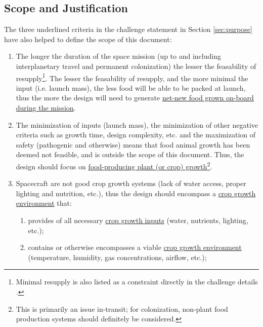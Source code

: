 \documentclass{report}
\begin{document}

\newpage

\subsection{Scope and Justification}
\label{sec:scope}

The three underlined criteria in the challenge statement in Section \ref{sec:purpose} have also helped to define the scope of this document:
\begin{enumerate}[label=SC\arabic*., ref=SC\arabic*]
\item \label{sc:1} The longer the duration of the space mission (up to and including interplanetary travel and permanent colonization) the lesser the feasability of
    resupply\footnote{Minimal resupply is also listed as a constraint directly in the challenge details \cite{applicantguide}.}.
    The lesser the feasability of resupply, and the more minimal the input (i.e. launch mass), the less food will be able to be packed at launch, thus the more the design will need to generate \uline{net-new food grown on-board during the mission}.
\item \label{sc:2} The minimization of inputs (launch mass), the minimization of other negative criteria such as growth time, design complexity, etc. and the maximization of safety (pathogenic and otherwise) means that food animal growth has been deemed not feasible, and is outside the scope of this document. Thus, the design should focus on \uline{food-producing plant (or crop)
    growth}\footnote{This is primarily an issue in-transit; for colonization, non-plant food production systems should definitely be considered.}.
\item \label{sc:3} Spacecraft are not good crop growth systems (lack of water access, proper lighting and nutrition, etc.), thus the design should encompass a \uline{crop growth environment} that:
    \begin{enumerate}[label=SC3\alph*., ref=SC3\alph*]
        \item \label{sc:3a} provides of all necessary \uline{crop growth inputs} (water, nutrients, lighting, etc.);
        \item \label{sc:3b} contains or otherwise encompasses a viable \uline{crop growth environment} (temperature, humidity, gas concentrations, airflow, etc.);

\end{enumerate}
\end{enumerate}
\end{document}
